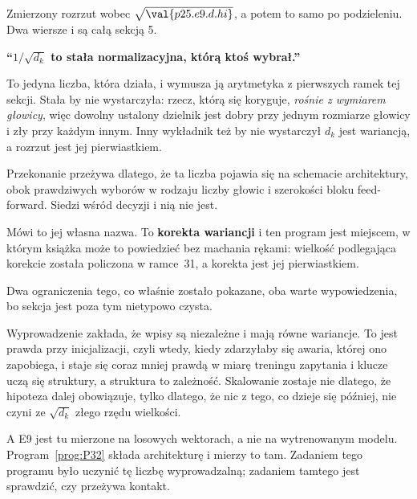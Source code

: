 \begin{fr}

Zmierzony rozrzut wobec $\sqrt{\val{p25.e9.d.hi}}$, a potem to samo po
podzieleniu. Dwa wiersze i są całą sekcją 5.
\end{fr}

\begin{fr}
\begin{trapbox}
\textbf{\enquote{$1/\sqrt{d_k}$ to stała normalizacyjna, którą ktoś
wybrał.}}

To jedyna liczba, która działa, i wymusza ją arytmetyka z pierwszych ramek tej
sekcji. Stała by nie wystarczyła: rzecz, którą się koryguje, \emph{rośnie z
wymiarem głowicy}, więc dowolny ustalony dzielnik jest dobry przy jednym
rozmiarze głowicy i zły przy każdym innym. Inny wykładnik też by nie
wystarczył \dash{} $d_k$ jest wariancją, a rozrzut jest jej pierwiastkiem.

Przekonanie przeżywa dlatego, że ta liczba pojawia się na schemacie
architektury, obok prawdziwych wyborów w rodzaju liczby głowic i szerokości
bloku feed-forward. Siedzi wśród decyzji i nią nie jest.

Mówi to jej własna nazwa. To \textbf{korekta wariancji} i ten program jest
miejscem, w którym książka może to powiedzieć bez machania rękami: wielkość
podlegająca korekcie została policzona w ramce~31, a korekta jest jej
pierwiastkiem.
\end{trapbox}
\end{fr}

\begin{fr}
Dwa ograniczenia tego, co właśnie zostało pokazane, oba warte wypowiedzenia,
bo sekcja jest poza tym nietypowo czysta.

Wyprowadzenie zakłada, że wpisy są niezależne i mają równe wariancje. To jest
prawda przy inicjalizacji, czyli wtedy, kiedy zdarzyłaby się awaria, której ono
zapobiega, i staje się coraz mniej prawdą w miarę treningu \dash{} zapytania i
klucze uczą się struktury, a struktura to zależność. Skalowanie zostaje nie
dlatego, że hipoteza dalej obowiązuje, tylko dlatego, że nic z tego, co dzieje
się później, nie czyni ze $\sqrt{d_k}$ złego rzędu wielkości.

A E9 jest tu mierzone na losowych wektorach, a nie na wytrenowanym modelu.
Program~\ref{prog:P32} składa architekturę i mierzy to tam. Zadaniem tego
programu było uczynić tę liczbę wyprowadzalną; zadaniem tamtego jest
sprawdzić, czy przeżywa kontakt.
\end{fr}

